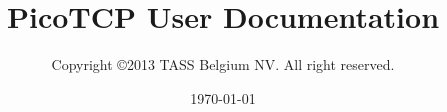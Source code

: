 %






\usepackage{longtable}

 \usepackage{draftwatermark}

\usepackage[compact]{titlesec}

\usepackage{enumitem}




\title{PicoTCP User Documentation}
\author{Copyright \copyright 2013 TASS Belgium NV. All right reserved.}
\date{\today}
\maketitle

\thispagestyle{empty}



\tableofcontents

%

